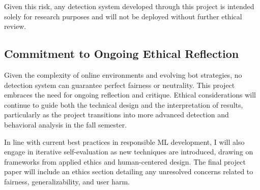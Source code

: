 \documentclass[10pt,twocolumn]{article}
\begin{document}
Given this risk, any detection system developed through this project is intended solely for research purposes and will not be deployed without further ethical review.

\subsection{Commitment to Ongoing Ethical Reflection}

Given the complexity of online environments and evolving bot strategies, no detection system can guarantee perfect fairness or neutrality. This project embraces the need for ongoing reflection and critique. Ethical considerations will continue to guide both the technical design and the interpretation of results, particularly as the project transitions into more advanced detection and behavioral analysis in the fall semester.

In line with current best practices in responsible ML development, I will also engage in iterative self-evaluation as new techniques are introduced, drawing on frameworks from applied ethics and human-centered design. The final project paper will include an ethics section detailing any unresolved concerns related to fairness, generalizability, and user harm.

\printbibliography
\end{document}
